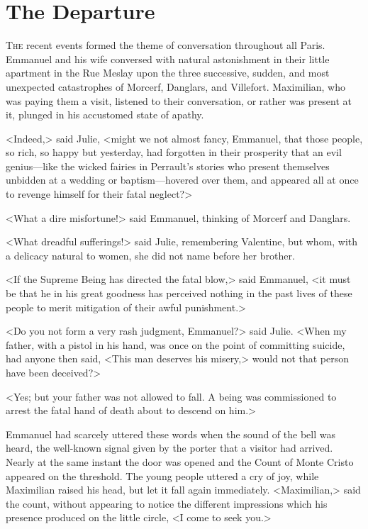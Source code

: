 \chapter{The Departure} 

 \lettrine{T}{he} recent events formed the theme of conversation throughout all Paris. Emmanuel and his wife conversed with natural astonishment in their little apartment in the Rue Meslay upon the three successive, sudden, and most unexpected catastrophes of Morcerf, Danglars, and Villefort. Maximilian, who was paying them a visit, listened to their conversation, or rather was present at it, plunged in his accustomed state of apathy. 

 <Indeed,> said Julie, <might we not almost fancy, Emmanuel, that those people, so rich, so happy but yesterday, had forgotten in their prosperity that an evil genius—like the wicked fairies in Perrault's stories who present themselves unbidden at a wedding or baptism—hovered over them, and appeared all at once to revenge himself for their fatal neglect?> 

 <What a dire misfortune!> said Emmanuel, thinking of Morcerf and Danglars. 

 <What dreadful sufferings!> said Julie, remembering Valentine, but whom, with a delicacy natural to women, she did not name before her brother. 

 <If the Supreme Being has directed the fatal blow,> said Emmanuel, <it must be that he in his great goodness has perceived nothing in the past lives of these people to merit mitigation of their awful punishment.> 

 <Do you not form a very rash judgment, Emmanuel?> said Julie. <When my father, with a pistol in his hand, was once on the point of committing suicide, had anyone then said, <This man deserves his misery,> would not that person have been deceived?> 

 <Yes; but your father was not allowed to fall. A being was commissioned to arrest the fatal hand of death about to descend on him.> 

 Emmanuel had scarcely uttered these words when the sound of the bell was heard, the well-known signal given by the porter that a visitor had arrived. Nearly at the same instant the door was opened and the Count of Monte Cristo appeared on the threshold. The young people uttered a cry of joy, while Maximilian raised his head, but let it fall again immediately.  <Maximilian,> said the count, without appearing to notice the different impressions which his presence produced on the little circle, <I come to seek you.> 

